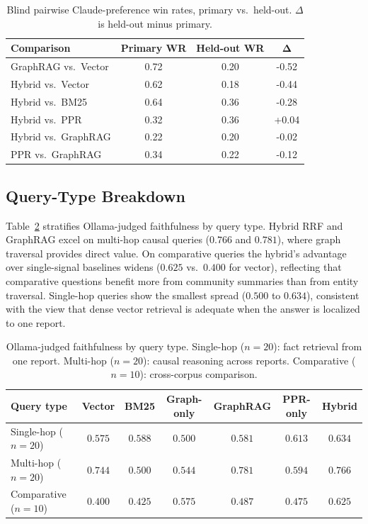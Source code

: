 \documentclass[10pt,a4paper]{article}
\begin{document}
\begin{table}[t]
\centering
\small
\caption{Blind pairwise Claude-preference win rates, primary vs.\
held-out. $\Delta$ is held-out minus primary.}
\label{tab:pw-crosscorpus}
\begin{tabular}{lccc}
\toprule
\textbf{Comparison} & \textbf{Primary WR} & \textbf{Held-out WR} & $\boldsymbol{\Delta}$ \\
\midrule
GraphRAG vs.\ Vector         & 0.72 & 0.20 & -0.52 \\
Hybrid vs.\ Vector           & 0.62 & 0.18 & -0.44 \\
Hybrid vs.\ BM25             & 0.64 & 0.36 & -0.28 \\
Hybrid vs.\ PPR              & 0.32 & 0.36 & +0.04 \\
Hybrid vs.\ GraphRAG         & 0.22 & 0.20 & -0.02 \\
PPR vs.\ GraphRAG            & 0.34 & 0.22 & -0.12 \\
\bottomrule
\end{tabular}
\end{table}


\subsection{Query-Type Breakdown}

Table~\ref{tab:query-type} stratifies Ollama-judged faithfulness by
query type. Hybrid RRF and GraphRAG excel on multi-hop causal queries
($0.766$ and $0.781$), where graph traversal provides direct value.
On comparative queries the hybrid's advantage over single-signal
baselines widens ($0.625$ vs.\ $0.400$ for vector), reflecting that
comparative questions benefit more from community summaries than from
entity traversal. Single-hop queries show the smallest spread
($0.500$ to $0.634$), consistent with the view that dense vector
retrieval is adequate when the answer is localized to one report.

\begin{table}[t]
\centering
\small
\caption{Ollama-judged faithfulness by query type. Single-hop ($n = 20$):
fact retrieval from one report. Multi-hop ($n = 20$): causal reasoning
across reports. Comparative ($n = 10$): cross-corpus comparison.}
\label{tab:query-type}
\begin{tabular}{lcccccc}
\toprule
\textbf{Query type} & \textbf{Vector} & \textbf{BM25} & \textbf{Graph-only} & \textbf{GraphRAG} & \textbf{PPR-only} & \textbf{Hybrid} \\
\midrule
Single-hop ($n = 20$)   & $0.575$ & $0.588$ & $0.500$ & $0.581$ & $0.613$ & $\mathbf{0.634}$ \\
Multi-hop ($n = 20$)    & $0.744$ & $0.500$ & $0.544$ & $\mathbf{0.781}$ & $0.594$ & $0.766$ \\
Comparative ($n = 10$)  & $0.400$ & $0.425$ & $0.575$ & $0.487$ & $0.475$ & $\mathbf{0.625}$ \\
\bottomrule
\end{tabular}
\end{table}
\end{document}
